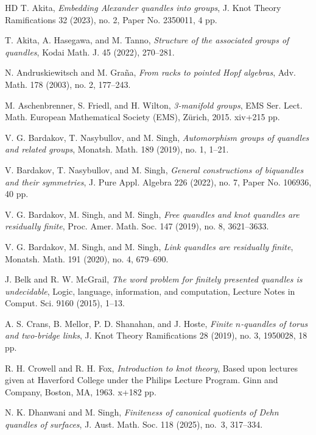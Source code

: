 \documentclass[12pt]{amsart}
\theoremstyle{definition}
\numberwithin{equation}{subsection}
\begin{document}
\begin{thebibliography}{HD}
 T. Akita, \textit{Embedding Alexander quandles into groups},  J. Knot Theory Ramifications 32 (2023), no. 2, Paper No. 2350011, 4 pp.

 T. Akita, A. Hasegawa, and M. Tanno, \textit{Structure of the associated groups of quandles}, Kodai Math. J. 45 (2022), 270--281.

 N. Andruskiewitsch and M. Gra\~{n}a, \textit{From racks to pointed Hopf algebras}, Adv. Math. 178 (2003), no. 2, 177--243.

 M. Aschenbrenner, S.  Friedl, and H. Wilton, \textit{3-manifold groups}, EMS Ser. Lect. Math. European Mathematical Society (EMS), Z\"{u}rich, 2015. xiv+215 pp.

 V. G. Bardakov, T. Nasybullov, and M. Singh,  \textit{Automorphism groups of quandles and related groups}, Monatsh. Math. 189 (2019), no. 1, 1--21.

 V. Bardakov, T. Nasybullov, and M. Singh, \textit{General constructions of biquandles and their symmetries}, J. Pure Appl. Algebra 226 (2022), no. 7, Paper No. 106936, 40 pp.


 V. G. Bardakov, M. Singh, and M. Singh, \textit{Free quandles and knot quandles are residually finite}, Proc. Amer. Math. Soc. 147 (2019), no. 8, 3621--3633. 

 V. G. Bardakov, M. Singh, and M. Singh,  \textit{Link quandles are residually finite}, Monatsh. Math. 191 (2020), no. 4, 679--690.

 J. Belk and R. W. McGrail, \textit{The word problem for finitely presented quandles is undecidable}, Logic, language, information, and computation, Lecture Notes in Comput. Sci. 9160 (2015), 1--13.


 A. S. Crans, B. Mellor, P. D. Shanahan, and J. Hoste, \textit{Finite $n$-quandles of torus and two-bridge links}, J. Knot Theory Ramifications 28 (2019), no. 3, 1950028, 18 pp.

 R. H. Crowell and R. H. Fox, \textit{Introduction to knot theory}, Based upon lectures given at Haverford College under the Philips Lecture Program. Ginn and Company, Boston, MA, 1963. x+182 pp.

 N. K. Dhanwani and M. Singh, \textit{Finiteness of canonical quotients of Dehn quandles of surfaces}, J. Aust. Math. Soc.  118 (2025), no.~3, 317--334.


\end{thebibliography}
\end{document}
